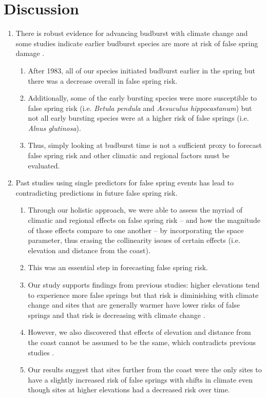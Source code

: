 \documentclass{article}\usepackage[]{graphicx}\usepackage[]{color}
\begin{document}
\section*{Discussion}
\begin{enumerate}
\item There is robust evidence for advancing budburst with climate change \citep{Cleland2007, Wolkovich2012, IPCC2014} and some studies indicate earlier budburst species are more at risk of false spring damage \citep{Ma2018}.
  \begin{enumerate}
  \item After 1983, all of our species initiated budburst earlier in the spring but there was a decrease overall in false spring risk.
  \item Additionally, some of the early bursting species were more susceptible to false spring risk (i.e. \textit{Betula pendula} and \textit{Aesuculus hippocastanum}) but not all early bursting species were at a higher risk of false springs (i.e. \textit{Alnus glutinosa}). 
  \item Thus, simply looking at budburst time is not a sufficient proxy to forecast false spring risk and other climatic and regional factors must be evaluated.
  \end{enumerate}
  
\item Past studies using single predictors for false spring events has lead to contradicting predictions in future false spring risk.
  \begin{enumerate}
  \item Through our holistic approach, we were able to assess the myriad of climatic and regional effects on false spring risk -- and how the magnitude of those effects compare to one another -- by incorporating the space parameter, thus erasing the collinearity issues of certain effects (i.e. elevation and distance from the coast).
  \item This was an essential step in forecasting false spring risk.
  \item Our study supports findings from previous studies: higher elevations tend to experience more false springs but that risk is diminishing with climate change \citep{Vitra2017} and sites that are generally warmer have lower risks of false springs and that risk is decreasing with climate change \citep{Wypych2016}.
  \item However, we also discovered that effects of elevation and distance from the coast cannot be assumed to be the same, which contradicts previous studies \citep{Ma2018}.
  \item Our results suggest that sites further from the coast were the only sites to have a slightly increased risk of false springs with shifts in climate even though sites at higher elevations had a decreased risk over time. 
  \end{enumerate}
  

\end{enumerate}
\end{document}
